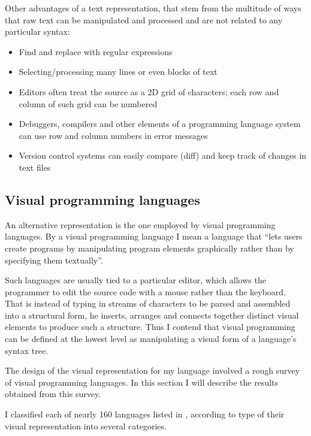 Other advantages of a text representation, that stem from the multitude of ways
that raw text can be manipulated and processed and are not related to any particular syntax:
\begin{itemize}
	\item Find and replace with regular expressions
	\item Selecting/processing many lines or even blocks of text
	\item Editors often treat the source as a 2D grid of characters; each
          row and column of such grid can be numbered
	\item Debuggers, compilers and other elements of a programming language
          system can use row and column numbers in error messages
	\item Version control systems can easily compare (diff) and keep track of changes in text files
\end{itemize}

\subsection{Visual programming languages}\label{sec:vpls}
An alternative representation is the one employed by visual programming
languages. By a visual programming language I mean a language that ``lets users create programs by manipulating program elements graphically rather than by specifying them textually''\cite{vpl_wikipedia, vpl_maturity}.

Such languages are usually tied to a particular editor, which allows
the programmer to edit the source code with a mouse rather than the
keyboard. That is instead of typing in streams of characters to be parsed and
assembled into a structural form, he
 inserts, arranges and connects together
distinct visual elements to produce such a structure. Thus I contend that visual
programming can be defined at the lowest level as manipulating a visual form of
a language's syntax tree.

The design of the visual representation for my language involved a rough survey
of visual programming languages. In this section I will describe the results obtained from this survey.

I classified each of nearly 160 languages listed in \cite{snapshots}, according
to type of their visual representation into several categories.

